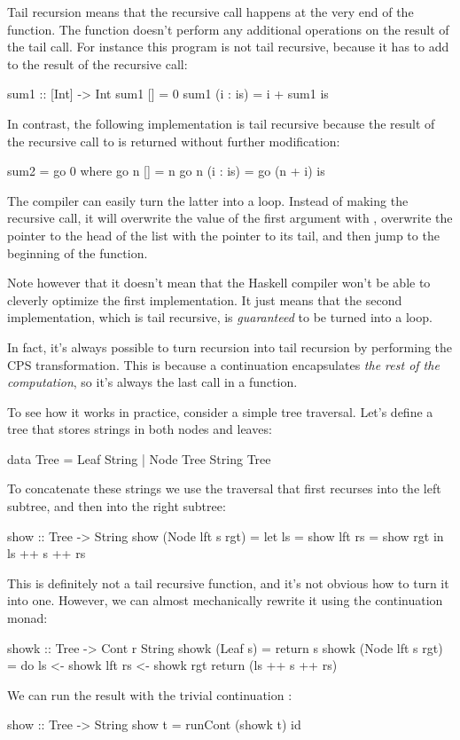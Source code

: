 \documentclass[DaoFP]{subfiles}
\begin{document}
Tail recursion means that the recursive call happens at the very end of the function. The function doesn't perform any additional operations on the result of the tail call. For instance this program is not tail recursive, because it has to add  to the result of the recursive call:
\begin{haskell}
sum1 :: [Int] -> Int
sum1 [] = 0
sum1 (i : is) = i + sum1 is
\end{haskell}
In contrast, the following implementation is tail recursive because the result of the recursive call to  is returned without further modification:
\begin{haskell}
sum2 = go 0 
  where go n [] = n
        go n (i : is) = go (n + i) is
\end{haskell}
The compiler can easily turn the latter into a loop. Instead of making the recursive call, it will overwrite the value of the first argument  with , overwrite the pointer to the head of the list with the pointer to its tail, and then jump to the beginning of the function. 

Note however that it doesn't mean that the Haskell compiler won't be able to cleverly optimize the first implementation. It just means that the second implementation, which is tail recursive, is \emph{guaranteed} to be turned into a loop.

In fact, it's always possible to turn recursion into tail recursion by performing the CPS transformation. This is because a continuation encapsulates \emph{the rest of the computation}, so it's always the last call in a function. 

To see how it works in practice, consider a simple tree traversal. Let's define a tree that stores strings in both nodes and leaves:
\begin{haskell}
data Tree = Leaf String 
          | Node Tree String Tree
\end{haskell}
To concatenate these strings we use the traversal that first recurses into the left subtree, and then into the right subtree:
\begin{haskell}
show :: Tree -> String
show (Node lft s rgt) =
  let ls = show lft
      rs = show rgt
  in ls ++ s ++ rs
\end{haskell}
This is definitely not a tail recursive function, and it's not obvious how to turn it into one. However, we can almost mechanically rewrite it using the continuation monad:
\begin{haskell}
showk :: Tree -> Cont r String
showk (Leaf s) = return s
showk (Node lft s rgt) = do
  ls <- showk lft
  rs <- showk rgt
  return (ls ++ s ++ rs)
 \end{haskell}
We can run the result with the trivial continuation :
\begin{haskell}
show :: Tree -> String
show t = runCont (showk t) id
\end{haskell}
\end{document}
